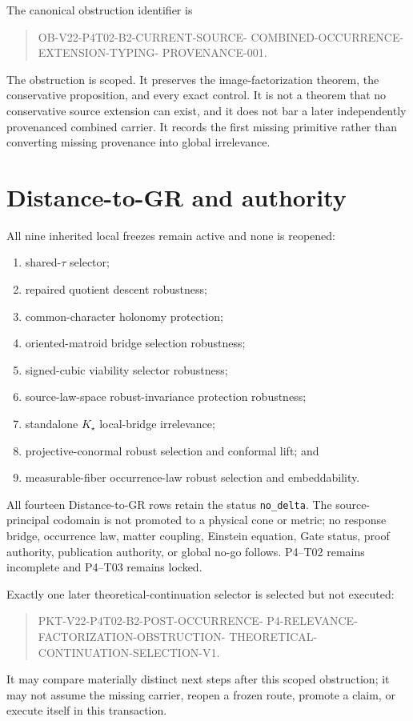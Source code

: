 \documentclass[11pt]{article}
\begin{document}
The canonical obstruction identifier is
\begin{quote}\small\ttfamily\raggedright
OB-V22-\allowbreak P4T02-B2-\allowbreak CURRENT-SOURCE-\allowbreak
COMBINED-OCCURRENCE-\allowbreak EXTENSION-TYPING-\allowbreak
PROVENANCE-001.
\end{quote}

The obstruction is scoped.  It preserves the image-factorization theorem,
the conservative proposition, and every exact control.  It is not a theorem
that no conservative source extension can exist, and it does not bar a later
independently provenanced combined carrier.  It records the first missing
primitive rather than converting missing provenance into global irrelevance.

\section{Distance-to-GR and authority}

All nine inherited local freezes remain active and none is reopened:
\begin{enumerate}
 \item shared-$\tau$ selector;
 \item repaired quotient descent robustness;
 \item common-character holonomy protection;
 \item oriented-matroid bridge selection robustness;
 \item signed-cubic viability selector robustness;
 \item source-law-space robust-invariance protection robustness;
 \item standalone $K_\star$ local-bridge irrelevance;
 \item projective-conormal robust selection and conformal lift; and
 \item measurable-fiber occurrence-law robust selection and embeddability.
\end{enumerate}

All fourteen Distance-to-GR rows retain the status \texttt{no\_delta}.
The source-principal codomain is not promoted to a physical cone or metric;
no response bridge, occurrence law, matter coupling, Einstein equation, Gate
status, proof authority, publication authority, or global no-go follows.
P4--T02 remains incomplete and P4--T03 remains locked.

Exactly one later theoretical-continuation selector is selected but not
executed:
\begin{quote}\small\ttfamily\raggedright
PKT-V22-\allowbreak P4T02-B2-\allowbreak POST-OCCURRENCE-\allowbreak
P4-RELEVANCE-\allowbreak FACTORIZATION-OBSTRUCTION-\allowbreak
THEORETICAL-CONTINUATION-\allowbreak SELECTION-V1.
\end{quote}
It may compare materially distinct next steps after this scoped obstruction;
it may not assume the missing carrier, reopen a frozen route, promote a claim,
or execute itself in this transaction.
\end{document}
